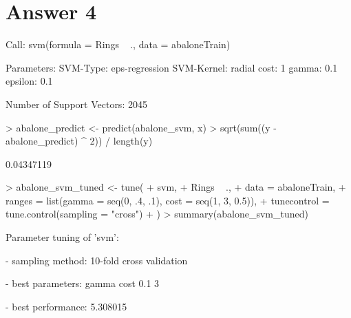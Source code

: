 \documentclass{article}
\begin{document}
\section*{Answer  4}

\begin{Schunk}
\begin{Soutput}
Call:
svm(formula = Rings ~ ., data = abaloneTrain)


Parameters:
   SVM-Type:  eps-regression 
 SVM-Kernel:  radial 
       cost:  1 
      gamma:  0.1 
    epsilon:  0.1 


Number of Support Vectors:  2045
\end{Soutput}
\begin{Sinput}
> abalone_predict <- predict(abalone_svm, x)
> sqrt(sum((y - abalone_predict) ^ 2)) / length(y)
\end{Sinput}
\begin{Soutput}
[1] 0.04347119
\end{Soutput}
\begin{Sinput}
> abalone_svm_tuned <- tune(
+   svm,
+   Rings ~ .,
+   data = abaloneTrain,
+   ranges = list(gamma = seq(0, .4, .1), cost = seq(1, 3, 0.5)),
+   tunecontrol = tune.control(sampling = "cross")
+ )
> summary(abalone_svm_tuned)
\end{Sinput}
\begin{Soutput}
Parameter tuning of 'svm':

- sampling method: 10-fold cross validation 

- best parameters:
 gamma cost
   0.1    3

- best performance: 5.308015 


\end{Soutput}
\end{Schunk}
\end{document}
